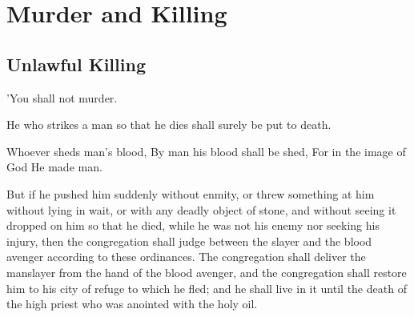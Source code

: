 \chapter{Murder and Killing}

\section{Unlawful Killing}

\begin{scripture}[Exodus 20:13]
    'You shall not murder.
\end{scripture}

\vspace{1\baselineskip}

\begin{scripture}[Exodus 21:12]
    He who strikes a man so that he dies shall surely be put to death.
\end{scripture}

\vspace{1\baselineskip}

\begin{scripture}[Genesis 9:6]
    Whoever sheds man's blood, By man his blood shall be shed, For in the image of God He made man.
\end{scripture}

\vspace{1\baselineskip}

\begin{scripture}[Numbers 35:22-25]
    But if he pushed him suddenly without enmity, or threw something at him without lying in wait,
    or with any deadly object of stone, and without seeing it dropped on him so that he died, while he was not his enemy nor seeking his injury,
    then the congregation shall judge between the slayer and the blood avenger according to these ordinances.
    The congregation shall deliver the manslayer from the hand of the blood avenger, and the congregation shall restore him to his city of refuge to which he fled; and he shall live in it until the death of the high priest who was anointed with the holy oil.
\end{scripture}

\vspace{2\baselineskip}

